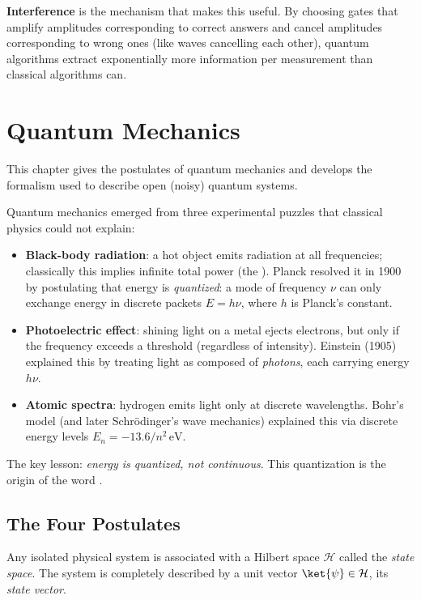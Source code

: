 \documentclass[oneside]{academica}
\begin{document}
\textbf{Interference} is the mechanism that makes this useful.
By choosing gates that amplify amplitudes corresponding to correct answers and cancel amplitudes corresponding to wrong ones (like waves cancelling each other), quantum algorithms extract exponentially more information per measurement than classical algorithms can.

\chapter{Quantum Mechanics}

This chapter gives the postulates of quantum mechanics and develops the formalism used to describe open (noisy) quantum systems.

Quantum mechanics emerged from three experimental puzzles that classical physics could not explain:
\begin{itemize}
  \item \textbf{Black-body radiation}: a hot object emits radiation at all frequencies; classically this implies infinite total power (the ).
    Planck resolved it in 1900 by postulating that energy is \emph{quantized}: a mode of frequency $\nu$ can only exchange energy in discrete packets $E=h\nu$, where $h$ is Planck's constant.
  \item \textbf{Photoelectric effect}: shining light on a metal ejects electrons, but only if the frequency exceeds a threshold (regardless of intensity).
    Einstein (1905) explained this by treating light as composed of \emph{photons}, each carrying energy $h\nu$.
  \item \textbf{Atomic spectra}: hydrogen emits light only at discrete wavelengths.
    Bohr's model (and later Schr\"{o}dinger's wave mechanics) explained this via discrete energy levels $E_n=-13.6/n^2\,\mathrm{eV}$.
\end{itemize}

The key lesson: \emph{energy is quantized, not continuous}.
This quantization is the origin of the word .

\section{The Four Postulates}

\begin{postulate}
  Any isolated physical system is associated with a Hilbert space $\mathcal{H}$ called the \emph{state space}.
  The system is completely described by a unit vector $\ket{\psi}\in\mathcal{H}$, its \emph{state vector}.
\end{postulate}
\end{document}
